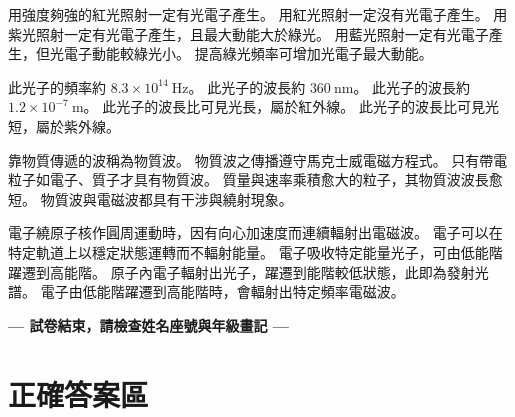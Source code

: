 \documentclass[10pt,a4paper]{article}
\begin{document}
{用強度夠強的紅光照射一定有光電子產生。}
{用紅光照射一定沒有光電子產生。}
{用紫光照射一定有光電子產生，且最大動能大於綠光。}
{用藍光照射一定有光電子產生，但光電子動能較綠光小。}
{提高綠光頻率可增加光電子最大動能。}

{此光子的頻率約 $8.3\times 10^{14}\ \mathrm{Hz}$。}
{此光子的波長約 $360\ \mathrm{nm}$。}
{此光子的波長約 $1.2\times 10^{-7}\ \mathrm{m}$。}
{此光子的波長比可見光長，屬於紅外線。}
{此光子的波長比可見光短，屬於紫外線。}


{靠物質傳遞的波稱為物質波。}
{物質波之傳播遵守馬克士威電磁方程式。}
{只有帶電粒子如電子、質子才具有物質波。}
{質量與速率乘積愈大的粒子，其物質波波長愈短。}
{物質波與電磁波都具有干涉與繞射現象。}

{電子繞原子核作圓周運動時，因有向心加速度而連續輻射出電磁波。}
{電子可以在特定軌道上以穩定狀態運轉而不輻射能量。}
{電子吸收特定能量光子，可由低能階躍遷到高能階。}
{原子內電子輻射出光子，躍遷到能階較低狀態，此即為發射光譜。}
{電子由低能階躍遷到高能階時，會輻射出特定頻率電磁波。}

\vfill
\begin{center}
    \large \textbf{--- 試卷結束，請檢查姓名座號與年級畫記 ---}
\end{center}

\label{EndOfExam}

\newpage
\section*{正確答案區}
\begin{center}
\end{center}
\end{document}
